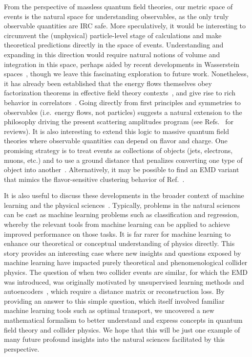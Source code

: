 \documentclass[letterpaper,11pt]{article}
\DeclareRobustCommand{\Ref}[1]{Ref.~\cite{#1}}
\DeclareRobustCommand{\Refs}[1]{Refs.~\cite{#1}}
\begin{document}
From the perspective of massless quantum field theories, our metric space of events is the natural space for understanding observables, as the only truly observable quantities are IRC safe.
%
More speculatively, it would be interesting to circumvent the (unphysical) particle-level stage of calculations and make theoretical predictions directly in the space of events.
%
Understanding and expanding in this direction would require natural notions of volume and integration in this space, perhaps aided by recent developments in Wasserstein spaces~\cite{DBLP:journals/siamma/BianchiniB10,DBLP:journals/siamma/AguehC11,DBLP:conf/gsi/BertrandK13,DBLP:conf/gsi/GouicL15}, though we leave this fascinating exploration to future work.
%
Nonetheless, it has already been established that the energy flows themselves obey factorization theorems in effective field theory contexts~\cite{Bauer:2008jx}, and give rise to rich behavior in correlators~\cite{Basham:1978zq,Belitsky:2013ofa,Dixon:2019uzg,Chen:2019bpb}.
%
Going directly from first principles and symmetries to observables (i.e.\ energy flows, not particles) suggests a natural extension to the philosophy driving the present scattering amplitudes program (see \Refs{Elvang:2013cua,Carrasco:2015iwa,Cheung:2017pzi} for reviews).
%
It is also interesting to extend this logic to massive quantum field theories where observable quantities can depend on flavor and charge.
%
One promising strategy is to treat events as collections of objects (jets, electrons, muons, etc.) and to use a ground distance that penalizes converting one type of object into another~\cite{Romao:2020ojy}.
%
Alternatively, it may be possible to find an EMD variant that mimics the flavor-sensitive clustering behavior of \Ref{Banfi:2006hf}.


It is also useful to discuss these developments in the broader context of machine learning and the physical sciences~\cite{Larkoski:2017jix,Radovic:NatureML,Carleo:2019ptp}.
%
Typically, problems in the natural sciences can be cast as machine learning problems such as classification and regression, whereby the relevant tools from machine learning can be applied to achieve improved performance on those tasks.
%
It is far rarer for machine learning to enhance our theoretical or conceptual understanding of physics directly.
%
This story provides an interesting case where new insights and questions exposed by machine learning have impacted purely theoretical and phenomenological collider physics.
%
The question of when two collider events are similar, for which the EMD was introduced, was originally motivated by unsupervised learning methods and autoencoders~\cite{Hajer:2018kqm,Heimel:2018mkt,Farina:2018fyg,Roy:2019jae}, which require a distance matrix or reconstruction loss.
%
By providing an answer to this simple question, which itself involved familiar machine learning tools such as optimal transport, we uncovered a new mathematical formalism to better understand and express concepts in quantum field theory and collider physics.
%
We hope that this will be just one example of many future profound insights into the natural sciences facilitated by this perspective.
\end{document}
